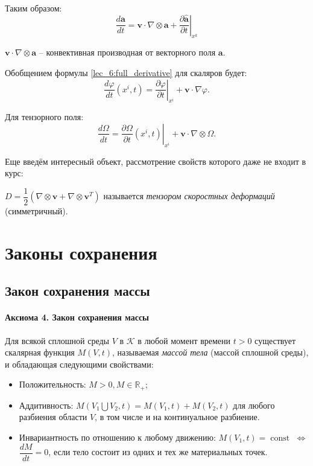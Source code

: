 Таким образом:
\begin{equation}\label{lec_6:full_derivative}
  \dfrac{d \mathbf{a}}{dt}
  = \mathbf{v} \cdot \nabla \otimes \mathbf{a}
  + \left. \dfrac{\partial \hat{\mathbf{a}}}{\partial t} \right|_{x^k}
\end{equation}



$\mathbf{v} \cdot \nabla \otimes \mathbf{a}$ -- конвективная производная от векторного поля $\mathbf{a}$.


Обобщением формулы \eqref{lec_6:full_derivative} для скаляров будет:
\[
  \dfrac{d\varphi}{dt} (x^i, t) = \left. \dfrac{\partial \varphi}{\partial t} \right|_{x^i}
  + \mathbf{v} \cdot \nabla \varphi.
\]

Для тензорного поля:
\[
  \dfrac{d\Omega}{dt} = \left. \dfrac{\partial \Omega}{\partial t} (x^i, t) \right|_{x^i}
    + \mathbf{v} \cdot \nabla \otimes \Omega.
\]

Еще введём интересный объект, рассмотрение свойств которого даже не входит в курс:

\begin{definition}
  $D = \dfrac{1}{2} \left( \nabla \otimes \mathbf{v} + \nabla \otimes \mathbf{v}^T \right) $
  называется \emph{тензором скоростных деформаций} (симметричный).
\end{definition}



\section{Законы сохранения}

\subsection{Закон сохранения массы}

\paragraph{Аксиома 4. Закон сохранения массы}
Для всякой сплошной среды $V$ в $\mathcal{K}$ в любой момент времени $t>0$
существует скалярная функция $M(V, t)$, называемая \emph{массой тела} (массой
сплошной среды), и обладающая следующими свойствами:
\begin{itemize}
  \item Положительность: $M>0, M \in \mathbb{R}_{+}$;
  \item Аддитивность: $M(V_1 \bigcup V_2, t) = M(V_1, t) + M(V_2, t)$
    для любого разбиения области $V$, в том числе и на континуальное разбиение.
  \item Инвариантность по отношению к любому движению: $M(V_1, t) = \operatorname{const}$
    $\Leftrightarrow$ $ \dfrac{dM}{dt} = 0 $, если тело состоит из одних и тех 
    же материальных точек.
\end{itemize}


